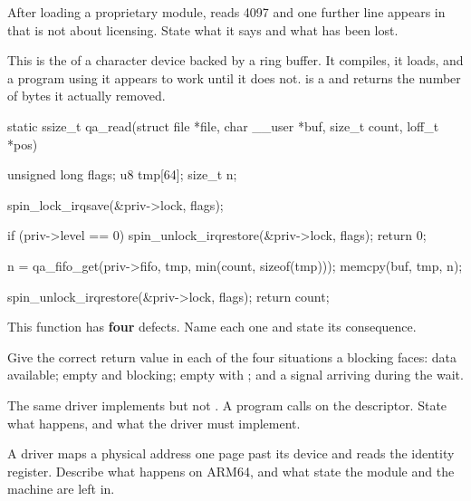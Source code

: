  After loading a proprietary module,  reads 4097 and one
further line appears in  that is not about licensing. State what it says and what has
been lost. 

\label{exb:q:5}

This is the  of a character device backed by a ring buffer. It compiles, it loads, and a
program using it appears to work until it does not.  is a  and
 returns the number of bytes it actually removed.

\begin{ccode}
static ssize_t qa_read(struct file *file, char __user *buf, size_t count, loff_t *pos)
{
        unsigned long flags;
        u8            tmp[64];
        size_t        n;

        spin_lock_irqsave(&priv->lock, flags);

        if (priv->level == 0) {
                spin_unlock_irqrestore(&priv->lock, flags);
                return 0;
        }

        n = qa_fifo_get(priv->fifo, tmp, min(count, sizeof(tmp)));
        memcpy(buf, tmp, n);

        spin_unlock_irqrestore(&priv->lock, flags);
        return count;
}
\end{ccode}

 This function has \textbf{four} defects. Name each one and state its consequence. 

 Give the correct return value in each of the four situations a blocking  faces:
data available; empty and blocking; empty with ; and a signal arriving during the
wait. 

 The same driver implements  but not . A program calls 
on the descriptor. State what happens, and what the driver must implement. 

\label{exb:q:6}

 A driver maps a physical address one page past its device and reads the identity register.
Describe what happens on ARM64, and what state the module and the machine are left in. 

